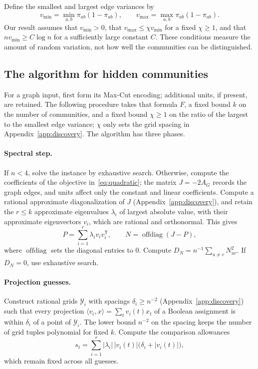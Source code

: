 \documentclass[11pt,a4paper]{article}
\theoremstyle{definition}
\theoremstyle{remark}
\begin{document}
Define the smallest and largest edge variances by
\[
 v_{\min}=\min_{a,b}\pi_{ab}(1-\pi_{ab}),\qquad
 v_{\max}=\max_{a,b}\pi_{ab}(1-\pi_{ab}).
\]
Our result assumes that $v_{\min}>0$, that $v_{\max}\le\chi v_{\min}$ for a
fixed $\chi\ge1$, and that $nv_{\min}\ge C\log n$ for a sufficiently large
constant $C$. These conditions measure the amount of random variation, not
how well the communities can be distinguished.

\subsection{The algorithm for hidden communities}

For a graph input, first form its Max-Cut encoding; additional units, if
present, are retained. The following procedure takes that formula $F$, a
fixed bound $k$ on the number of communities, and a fixed bound $\chi\ge1$
on the ratio of the largest to the smallest edge variance; $\chi$ only sets
the grid spacing in Appendix~\ref{app:discovery}. The algorithm has three
phases.

\paragraph{Spectral step.}
If $n<4$, solve the instance by exhaustive search. Otherwise, compute the
coefficients of the objective in~\eqref{eq:quadratic}; the matrix
$J=-2A_G$ records the graph edges, and units affect only the constant and
linear coefficients. Compute a rational approximate diagonalization of $J$
(Appendix~\ref{app:discovery}), and retain the $r\le k$ approximate
eigenvalues $\lambda_i$ of largest absolute value, with their approximate
eigenvectors $v_i$, which are rational and orthonormal. This gives
\[
 P=\sum_{i=1}^{r}\lambda_i v_i v_i^{\mathsf T},
 \qquad N=\operatorname{offdiag}(J-P),
\]
where $\operatorname{offdiag}$ sets the diagonal entries to $0$. Compute
$D_N=n^{-1}\sum_{u\ne v}N_{uv}^2$. If $D_N=0$, use exhaustive search.

\paragraph{Projection guesses.}
Construct rational grids $\mathcal Y_i$ with spacings
$\delta_i\ge n^{-2}$ (Appendix~\ref{app:discovery}) such that every
projection $\langle v_i,x\rangle=\sum_t v_i(t)x_t$ of a Boolean assignment
is within $\delta_i$ of a point of $\mathcal Y_i$. The lower bound $n^{-2}$
on the spacing keeps the number of grid tuples polynomial for fixed $k$.
Compute the comparison allowances
\begin{equation}
 s_t=\sum_{i=1}^{r}|\lambda_i|\,|v_i(t)|
                       \bigl(\delta_i+|v_i(t)|\bigr),
                       \label{eq:community_slack}
\end{equation}
which remain fixed across all guesses.
\end{document}
